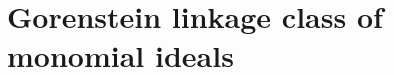 \documentclass[11pt,letterpaper]{amsart}
\newcommand{\seq}{\subseteq}
\DeclareMathOperator{\Ass}{Ass}
\theoremstyle{plain}
\newtheorem{cor}[thm]{Corollary}
\theoremstyle{definition}
\theoremstyle{remark}
\newtheorem{remark}[thm]{Remark}
\begin{document}

\section{Gorenstein linkage class of monomial ideals}
\end{document}
